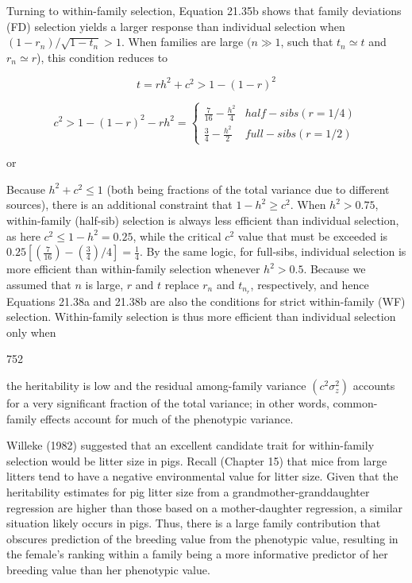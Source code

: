 \documentclass{article}
\begin{document}
Turning to within-family selection, Equation 21.35b shows that family deviations (FD) selection yields a larger response than individual selection when  $ (1 - r_n)/\sqrt{1 - t_n} > 1 $. When families are large  $ (n \gg 1 $, such that  $ t_n \simeq t $ and  $ r_n \simeq r $), this condition reduces to

\begin{equation}
t=rh^{2}+c^{2}>1-(1-r)^{2}
\tag{21.38a}
\label{eq:21_38a}
\end{equation}

\begin{equation}
c^{2}>1-\left(1-r\right)^{2}-r h^{2}=\left\{\begin{array}{ll}\displaystyle\frac{7}{16}-\frac{h^{2}}{4}&half-sibs(r=1/4)\\ \displaystyle\frac{3}{4}-\frac{h^{2}}{2}&full-sibs(r=1/2)\end{array}\right.
\tag{21.38b}
\label{eq:21_38b}
\end{equation}

or

Because  $ h^2 + c^2 \leq 1 $ (both being fractions of the total variance due to different sources), there is an additional constraint that  $ 1 - h^2 \geq c^2 $. When  $ h^2 > 0.75 $, within-family (half-sib) selection is always less efficient than individual selection, as here  $ c^2 \leq 1 - h^2 = 0.25 $, while the critical  $ c^2 $ value that must be exceeded is  $ 0.25 \left[ \left( \frac{7}{16} \right) - \left( \frac{3}{4} \right) / 4 \right] = \frac{1}{4} $. By the same logic, for full-sibs, individual selection is more efficient than within-family selection whenever  $ h^2 > 0.5 $. Because we assumed that  $ n $ is large,  $ r $ and  $ t $ replace  $ r_n $ and  $ t_{n_r} $, respectively, and hence Equations 21.38a and 21.38b are also the conditions for strict within-family (WF) selection. Within-family selection is thus more efficient than individual selection only when

752

the heritability is low and the residual among-family variance  $ (c^{2}\sigma_{z}^{2}) $ accounts for a very significant fraction of the total variance; in other words, common-family effects account for much of the phenotypic variance.

Willeke (1982) suggested that an excellent candidate trait for within-family selection would be litter size in pigs. Recall (Chapter 15) that mice from large litters tend to have a negative environmental value for litter size. Given that the heritability estimates for pig litter size from a grandmother-granddaughter regression are higher than those based on a mother-daughter regression, a similar situation likely occurs in pigs. Thus, there is a large family contribution that obscures prediction of the breeding value from the phenotypic value, resulting in the female's ranking within a family being a more informative predictor of her breeding value than her phenotypic value.
\end{document}
